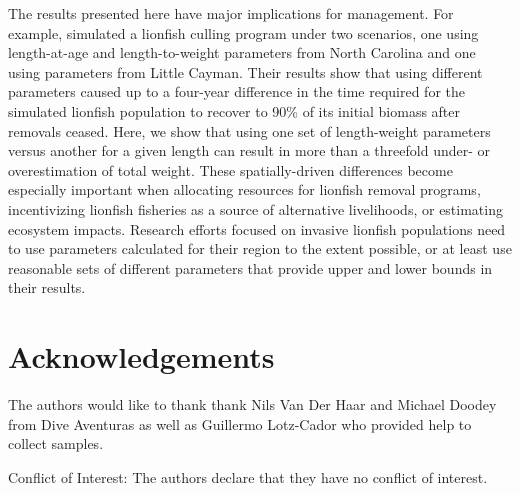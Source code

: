 \documentclass[fleqn,10pt,lineno]{wlpeerj} %
\begin{document}
The results presented here have major implications for management. For
example, \citet{edwards_2014} simulated a lionfish culling program under
two scenarios, one using length-at-age and length-to-weight parameters
from North Carolina and one using parameters from Little Cayman. Their
results show that using different parameters caused up to a four-year
difference in the time required for the simulated lionfish population to
recover to 90\% of its initial biomass after removals ceased. Here, we
show that using one set of length-weight parameters versus another for a
given length can result in more than a threefold under- or
overestimation of total weight. These spatially-driven differences
become especially important when allocating resources for lionfish
removal programs, incentivizing lionfish fisheries as a source of
alternative livelihoods, or estimating ecosystem impacts. Research
efforts focused on invasive lionfish populations need to use parameters
calculated for their region to the extent possible, or at least use
reasonable sets of different parameters that provide upper and lower
bounds in their results.

\section*{Acknowledgements}

The authors would like to thank thank Nils Van Der Haar and Michael
Doodey from Dive Aventuras as well as Guillermo Lotz-Cador who provided
help to collect samples.

Conflict of Interest: The authors declare that they have no conflict of
interest.


\end{document}
